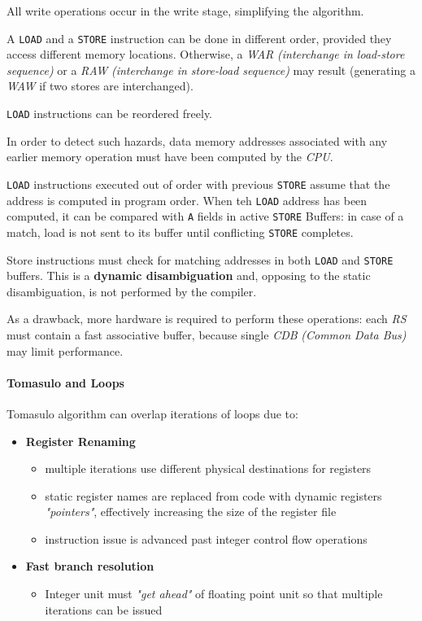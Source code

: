 \documentclass[english]{article}
\begin{document}
All write operations occur in the write stage, simplifying the algorithm.

\bigskip
A \texttt{LOAD} and a \texttt{STORE} instruction can be done in different order, provided they access different memory locations.
Otherwise, a \textit{WAR} \textit{(interchange in load-store sequence)} or a \textit{RAW} \textit{(interchange in store-load sequence)} may result (generating a \textit{WAW} if two stores are interchanged).

\texttt{LOAD} instructions can be reordered freely.

In order to detect such hazards, data memory addresses associated with any earlier memory operation must have been computed by the \textit{CPU}.

\bigskip
\texttt{LOAD} instructions executed out of order with previous \texttt{STORE} assume that the address is computed in program order.
When teh \texttt{LOAD} address has been computed, it can be compared with \texttt{A} fields in active \texttt{STORE} Buffers: in case of a match, load is not sent to its buffer until conflicting \texttt{STORE} completes.

Store instructions must check for matching addresses in both \texttt{LOAD} and \texttt{STORE} buffers.
This is a \textbf{dynamic disambiguation} and, opposing to the static disambiguation, is not performed by the compiler.

As a drawback, more hardware is required to perform these operations: each \textit{RS} must contain a fast associative buffer, because single \textit{CDB} \textit{(Common Data Bus)}  may limit performance.

\paragraph{Tomasulo and Loops}

Tomasulo algorithm can overlap iterations of loops due to:

\begin{itemize}
  \item \textbf{Register Renaming}
        \begin{itemize}
          \item multiple iterations use different physical destinations for registers
          \item static register names are replaced from code with dynamic registers \textit{"pointers"}, effectively increasing the size of the register file
          \item instruction issue is advanced past integer control flow operations
        \end{itemize}
  \item \textbf{Fast branch resolution}
        \begin{itemize}
          \item Integer unit must \textit{"get ahead"} of floating point unit so that multiple iterations can be issued
        \end{itemize}
\end{itemize}
\end{document}
